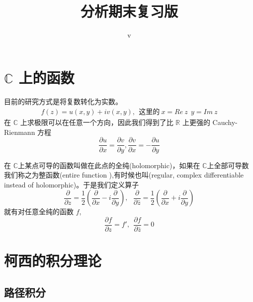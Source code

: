 \documentclass{article}
\title{分析期末复习版 }
\author{v}
\begin{document}
\maketitle
\tableofcontents

\section{$\mathbb{C}$ 上的函数}
目前的研究方式是将复数转化为实数。
\begin{align}
    f(z)=u(x,y)+iv(x,y),\ \ \text{这里的} \ x=Re\ z \ \ y= Im\ z 
\end{align}
在 $ \mathbb{C}  $ 上求极限可以在任意一个方向，因此我们得到了比 $ \mathbb{R}  $ 上更强的 Cauchy-Rienmann 方程
 \begin{equation}
    \frac{\partial u}{\partial x}=\frac{\partial v}{\partial y},\frac{\partial v}{\partial x}=-\frac{\partial u}{\partial y}
 \end{equation}

 在 $ \mathbb{C}  $上某点可导的函数叫做在此点的全纯(holomorphic)，如果在 $ \mathbb{C} $上全部可导数我们称之为整函数(entire function ),有时候也叫(regular, complex differentiable instead of holomorphic)。于是我们定义算子
 \begin{equation}
    \frac{\partial }{\partial z }=\frac{1}{2}(\frac{\partial }{\partial x}-i \frac{\partial }{\partial y}),\ \ \ \frac{\partial }{\partial \bar{z}}=\frac{1}{2}(\frac{\partial }{\partial x}+i \frac{\partial }{\partial y})
 \end{equation}
 就有对任意全纯的函数 $ f $,
 \begin{equation}
    \frac{\partial f}{\partial z}=f',\ \ \frac{\partial f}{\partial \bar{z} }=0
 \end{equation}

 \section{柯西的积分理论}
 \subsection{路径积分}
\end{document}
